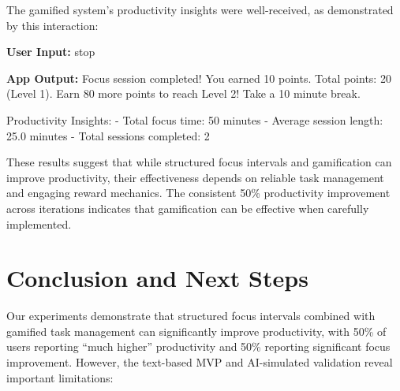 \documentclass{article} %
\begin{document}
The gamified system's productivity insights were well-received, as demonstrated by this interaction:

\begin{Userinput}
\textbf{User Input:} stop
\end{Userinput}

\begin{Appoutput}
\textbf{App Output:} Focus session completed! You earned 10 points. Total points: 20 (Level 1). Earn 80 more points to reach Level 2! Take a 10 minute break.

Productivity Insights:
- Total focus time: 50 minutes
- Average session length: 25.0 minutes
- Total sessions completed: 2
\end{Appoutput}

These results suggest that while structured focus intervals and gamification can improve productivity, their effectiveness depends on reliable task management and engaging reward mechanics. The consistent 50\% productivity improvement across iterations indicates that gamification can be effective when carefully implemented.




  

\section{Conclusion and Next Steps}
\label{sec:conclusion}

Our experiments demonstrate that structured focus intervals combined with gamified task management can significantly improve productivity, with 50\% of users reporting ``much higher'' productivity and 50\% reporting significant focus improvement. However, the text-based MVP and AI-simulated validation reveal important limitations:
\end{document}
